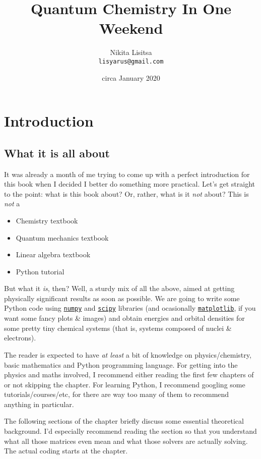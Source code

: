\documentclass{book}
\title{Quantum Chemistry In One Weekend}
\author{Nikita Lisitsa \\ \texttt{lisyarus@gmail.com}}
\date{circa January 2020}
\begin{document}
\maketitle

\tableofcontents

\chapter{Introduction} \label{chap:intro}

\section{What it is all about}
It was already a month of me trying to come up with a perfect introduction for this book when I decided I better do something more practical. Let's get straight to the point: what is this book about? Or, rather, what is it \textit{not} about? This is \textit{not} a

\begin{itemize}
\item Chemistry textbook
\item Quantum mechanics textbook
\item Linear algebra textbook
\item Python tutorial
\end{itemize}

But what it \textit{is}, then? Well, a sturdy mix of all the above, aimed at getting physically significant results as soon as possible. We are going to write some Python code using \href{https://numpy.org}{\texttt{numpy}} and \href{https://www.scipy.org}{\texttt{scipy}} libraries (and ocasionally \href{https://matplotlib.org}{\texttt{matplotlib}}, if you want some fancy plots \& images) and obtain energies and orbital densities for some pretty tiny chemical systems (that is, systems composed of nuclei \& electrons).

The reader is expected to have \textit{at least} a bit of knowledge on physics/chemistry, basic mathematics and Python programming language. For getting into the physics and maths involved, I recommend either reading the first few chapters of \cite{ref:atkins} or not skipping the  chapter. For learning Python, I recommend googling some tutorials/courses/etc, for there are way too many of them to recommend anything in particular.

The following sections of the   chapter briefly discuss some essential theoretical background. I'd especially recommend reading the  section so that you understand what all those matrices even mean and what those solvers are actually solving. The actual coding starts at the  chapter.
\end{document}
